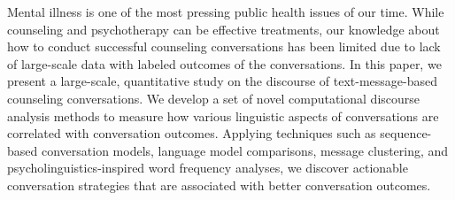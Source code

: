 Mental illness is one of the most pressing public health issues of our time. While counseling and psychotherapy can be effective treatments, our knowledge about how to conduct successful counseling conversations has been limited due to lack of large-scale data with labeled outcomes of the conversations. In this paper, we present a large-scale, quantitative study on the discourse of text-message-based counseling conversations. We develop a set of novel computational discourse analysis methods to measure how various linguistic aspects of conversations are correlated with conversation outcomes. Applying techniques such as sequence-based conversation models, language model comparisons, message clustering, and psycholinguistics-inspired word frequency analyses, we discover actionable conversation strategies that are associated with better conversation outcomes.

